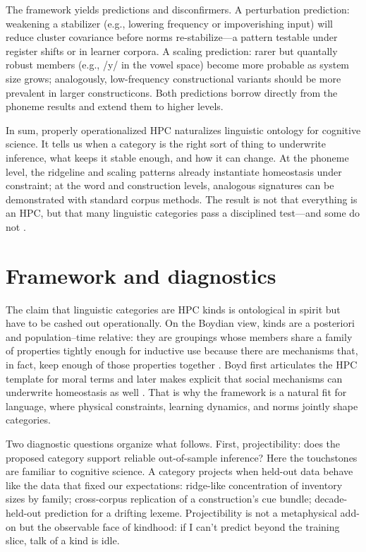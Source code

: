 \documentclass[12pt]{article}
\begin{document}
The framework yields predictions and disconfirmers. A perturbation prediction: weakening a stabilizer (e.g., lowering frequency or impoverishing input) will reduce cluster covariance before norms re-stabilize---a pattern testable under register shifts or in learner corpora. A scaling prediction: rarer but quantally robust members (e.g., /y/ in the vowel space) become more probable as system size grows; analogously, low-frequency constructional variants should be more prevalent in larger constructicons. Both predictions borrow directly from the phoneme results \citep[Fig.\,2 p.\,7]{Ekstrom2025PhonemeTool} and extend them to higher levels.

In sum, properly operationalized HPC naturalizes linguistic ontology for cognitive science. It tells us when a category is the right sort of thing to underwrite inference, what keeps it stable enough, and how it can change. At the phoneme level, the ridgeline and scaling patterns already instantiate homeostasis under constraint; at the word and construction levels, analogous signatures can be demonstrated with standard corpus methods. The result is not that everything is an HPC, but that many linguistic categories pass a disciplined test---and some do not \citep{Miller2021WordsSpeciesKinds,Ekstrom2025PhonemeTool}.

\section{Framework and diagnostics}\label{sec:framework}

The claim that linguistic categories are HPC kinds is ontological in spirit but have to be cashed out operationally. On the Boydian view, kinds are a posteriori and population–time relative: they are groupings whose members share a family of properties tightly enough for inductive use because there are mechanisms that, in fact, keep enough of those properties together \citep{Boyd1991Enthusiasm,Boyd1999Homeostasis}. Boyd first articulates the \textsc{HPC} template for moral terms \citep[§3.8]{Boyd1988MoralRealist} and later makes explicit that social mechanisms can underwrite homeostasis as well \citep{Boyd2000Workmanship}. That is why the framework is a natural fit for language, where physical constraints, learning dynamics, and norms jointly shape categories.

Two diagnostic questions organize what follows. First, projectibility: does the proposed category support reliable out-of-sample inference? Here the touchstones are familiar to cognitive science. A category projects when held-out data behave like the data that fixed our expectations: ridge-like concentration of inventory sizes by family; cross-corpus replication of a construction’s cue bundle; decade-held-out prediction for a drifting lexeme. Projectibility is not a metaphysical add-on but the observable face of kindhood: if I can't predict beyond the training slice, talk of a kind is idle.
\end{document}
